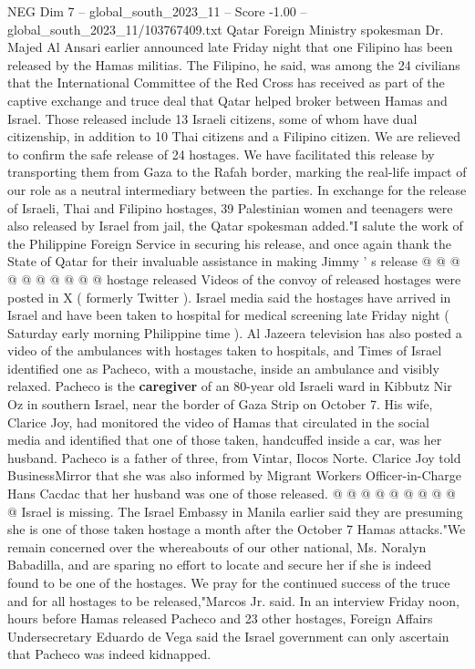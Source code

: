 \begin{textsample}{NEG Dim 7 – global\_south\_2023\_11 – Score -1.00 – global\_south\_2023\_11/103767409.txt}  \label{ex:f7_neg_154}
Qatar Foreign Ministry spokesman Dr.
Majed Al Ansari earlier announced late Friday night that one Filipino has been released by the Hamas militias.
The Filipino, he said, was among the 24 civilians that the International Committee of the Red Cross has received as part of the captive exchange and truce deal that Qatar helped broker between Hamas and Israel.
Those released include 13 Israeli citizens, some of whom have dual citizenship, in addition to 10 Thai citizens and a Filipino citizen.
We are relieved to confirm the safe release of 24 hostages.
We have facilitated this release by transporting them from Gaza to the Rafah border, marking the real-life impact of our role as a neutral intermediary between the parties.
In exchange for the release of Israeli, Thai and Filipino hostages, 39 Palestinian women and teenagers were also released by Israel from jail, the Qatar spokesman added."I salute the work of the Philippine Foreign Service in securing his release, and once again thank the State of Qatar for their invaluable assistance in making Jimmy ' s release @ @ @ @ @ @ @ @ @ @ hostage released Videos of the convoy of released hostages were posted in X ( formerly Twitter ).
Israel media said the hostages have arrived in Israel and have been taken to hospital for medical screening late Friday night ( Saturday early morning Philippine time ).
Al Jazeera television has also posted a video of the ambulances with hostages taken to hospitals, and Times of Israel identified one as Pacheco, with a moustache, inside an ambulance and visibly relaxed.
Pacheco is the \textbf{caregiver} of an 80-year old Israeli ward in Kibbutz Nir Oz in southern Israel, near the border of Gaza Strip on October 7.
His wife, Clarice Joy, had monitored the video of Hamas that circulated in the social media and identified that one of those taken, handcuffed inside a car, was her husband.
Pacheco is a father of three, from Vintar, Ilocos Norte.
Clarice Joy told BusinessMirror that she was also informed by Migrant Workers Officer-in-Charge Hans Cacdac that her husband was one of those released. @ @ @ @ @ @ @ @ @ @ Israel is missing.
The Israel Embassy in Manila earlier said they are presuming she is one of those taken hostage a month after the October 7 Hamas attacks."We remain concerned over the whereabouts of our other national, Ms.
Noralyn Babadilla, and are sparing no effort to locate and secure her if she is indeed found to be one of the hostages.
We pray for the continued success of the truce and for all hostages to be released,"Marcos Jr. said.
In an interview Friday noon, hours before Hamas released Pacheco and 23 other hostages, Foreign Affairs Undersecretary Eduardo de Vega said the Israel government can only ascertain that Pacheco was indeed kidnapped.

\end{textsample}
